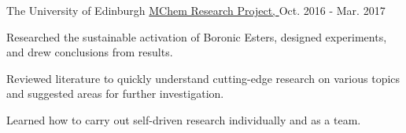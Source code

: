 \begin{cventries}
  \cventry
    {The University of Edinburgh} %
    {\href{https://www.evernote.com/shard/s234/sh/559f3e12-1aa6-4d68-a68b-3ddaf8526b9c/ccfcc1f7a32c8966587de6b8983877cb}{MChem Research Project, }} %
    {} %
    {Oct. 2016 - Mar. 2017} %
    {
    \begin{cvitems} %
      \item {Researched the sustainable activation of Boronic Esters, designed experiments, and drew conclusions from results.}
      \item {Reviewed literature to quickly understand cutting-edge research on various topics and suggested areas for further investigation.}
      \item{Learned how to carry out self-driven research individually and as a team.}
    \end{cvitems}
    }

\end{cventries}
